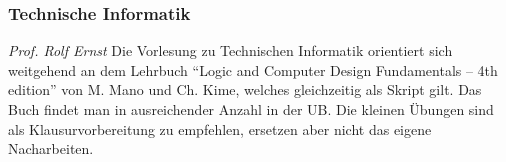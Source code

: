 
\subsubsection{Technische Informatik}
	\textit{Prof. Rolf Ernst}
	Die Vorlesung zu Technischen Informatik orientiert sich
	weitgehend an dem Lehrbuch \enquote{Logic and Computer Design
	Fundamentals – 4th edition} von M. Mano und Ch. Kime, welches
	gleichzeitig als Skript gilt. Das Buch findet man in
	ausreichender Anzahl in der UB. Die kleinen Übungen sind als
	Klausurvorbereitung zu empfehlen, ersetzen aber nicht das eigene
	Nacharbeiten. 